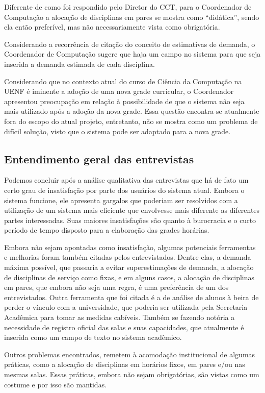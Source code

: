 Diferente de como foi respondido pelo Diretor do CCT, para o Coordenador de Computação a alocação de disciplinas em pares se mostra como ``didática'', sendo ela então preferível, mas não necessariamente vista como obrigatória.

Considerando a recorrência de citação do conceito de estimativas de demanda, o Coordenador de Computação sugere que haja um campo no sistema para que seja inserida a demanda estimada de cada disciplina.

Considerando que no contexto atual do curso de Ciência da Computação na UENF é iminente a adoção de uma nova grade curricular, o Coordenador apresentou preocupação em relação à possibilidade de que o sistema não seja mais utilizado após a adoção da nova grade. Essa questão encontra-se atualmente fora do escopo do atual projeto, entretanto, não se mostra como um problema de difícil solução, visto que o sistema pode ser adaptado para a nova grade.

\subsection{Entendimento geral das entrevistas} %

Podemos concluir após a análise qualitativa das entrevistas que há de fato um certo grau de insatisfação por parte dos usuários do sistema atual. Embora o sistema funcione, ele apresenta gargalos que poderiam ser resolvidos com a utilização de um sistema mais eficiente que envolvesse mais diferente as diferentes partes interessadas. Suas maiores insatisfações são quanto à burocracia e o curto período de tempo disposto para a elaboração das grades horárias.

Embora não sejam apontadas como insatisfação, algumas potenciais ferramentas e melhorias foram também citadas pelos entrevistados. Dentre elas, a demanda máxima possível, que passaria a evitar superestimações de demanda, a alocação de disciplinas de serviço como fixas, e em alguns casos, a alocação de disciplinas em pares, que embora não seja uma regra, é uma preferência de um dos entrevistados. Outra ferramenta que foi citada é a de análise de alunos à beira de perder o vínculo com a universidade, que poderia ser utilizada pela Secretaria Acadêmica para tomar as medidas cabíveis. Também se fazendo notória a necessidade de registro oficial das salas e suas capacidades, que atualmente é inserida como um campo de texto no sistema acadêmico.

Outros problemas encontrados, remetem à acomodação institucional de algumas práticas, como a alocação de disciplinas em horários fixos, em pares e/ou nas mesmas salas. Essas práticas, embora não sejam obrigatórias, são vistas como um costume e por isso são mantidas.

